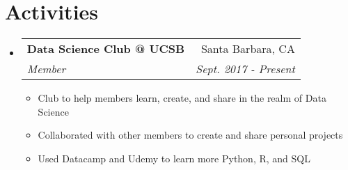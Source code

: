 \documentclass[letterpaper,11pt]{article}
\makeatletter
\newcommand{\resumeItem}[2]{
  \item\small{
    \textbf{#1}{#2 \vspace{-2pt}}
  }
}
\newcommand{\resumeSubheading}[4]{
  \vspace{-1pt}\item
    \begin{tabular*}{0.97\textwidth}[t]{l@{\extracolsep{\fill}}r}
      \textbf{#1} & #2 \\
      \textit{\small#3} & \textit{\small #4} \\
    \end{tabular*}\vspace{-5pt}
}
\newcommand{\resumeSubHeadingListStart}{\begin{itemize}[label=,leftmargin=*]}
\newcommand{\resumeSubHeadingListEnd}{\end{itemize}}
\newcommand{\resumeItemListStart}{\begin{itemize}}
\newcommand{\resumeItemListEnd}{\end{itemize}\vspace{-5pt}}
\makeatother
\begin{document}
\section{Activities}
  \resumeSubHeadingListStart

    \resumeSubheading
      {Data Science Club @ UCSB}{Santa Barbara, CA}
      {Member}{Sept. 2017 - Present}
      \resumeItemListStart
        \resumeItem{}
          {Club to help members learn, create, and share in the realm of Data Science}
        \resumeItem{}
          {Collaborated with other members to create and share personal projects}
        \resumeItem{}
          {Used Datacamp and Udemy to learn more Python, R, and SQL}
      \resumeItemListEnd
  \resumeSubHeadingListEnd    


\end{document}
